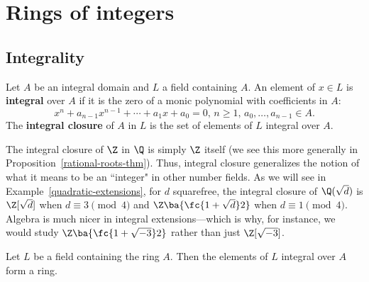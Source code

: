 \chapter{Rings of integers}

\section{Integrality}
\begin{df}
Let $A$ be an integral domain and $L$ a field containing $A$. An element of $x\in L$ is \textbf{integral} over $A$ if it is the zero of a monic polynomial with coefficients in $A$:
\[
x^n+a_{n-1}x^{n-1}+\cdots +a_1x+a_0=0,\, n\ge 1,\, a_0,\ldots, a_{n-1}\in A.
\]
The \textbf{integral closure} of $A$ in $L$ is the set of elements of $L$ integral over $A$.
\end{df}
\begin{ex}
The integral closure of $\Z$ in $\Q$ is simply $\Z$ itself (we see this more generally in Proposition~\ref{rational-roots-thm}). Thus, integral closure generalizes the notion of what it means to be an ``integer" in other number fields. As we will see in Example~\ref{quadratic-extensions}, for $d$ squarefree, the integral closure of $\Q(\sqrt{d})$ is $\Z[\sqrt{d}]$ when $d\equiv 3\pmod 4$ and $\Z\ba{\fc{1+\sqrt{d}}2}$ when $d\equiv 1\pmod 4$. Algebra is much nicer in integral extensions---which is why, for instance, we would study $\Z\ba{\fc{1+\sqrt{-3}}2}$ rather than just $\Z[\sqrt{-3}]$.
\end{ex}
\begin{thm}
Let $L$ be a field containing the ring $A$. Then
the elements of $L$ integral over $A$ form a ring.
\end{thm}
